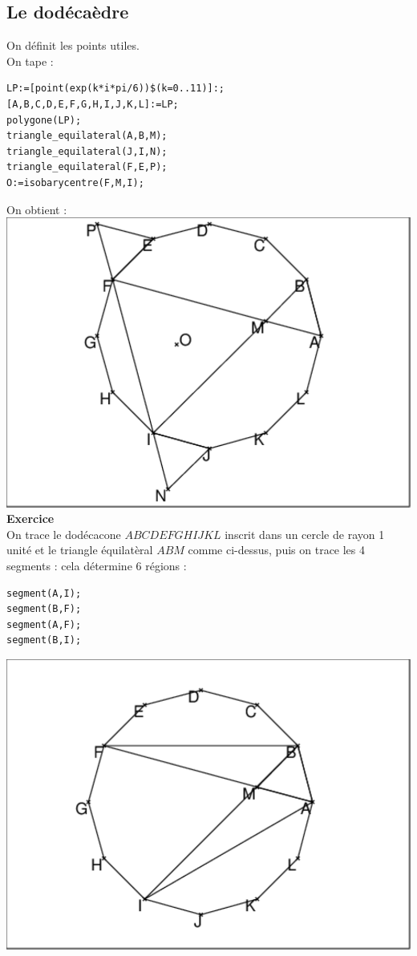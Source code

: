 \documentclass[a4paper,11pt]{book}
\begin{document}
\subsection{Le dod\'eca\`edre}
On d\'efinit les points utiles.\\
On tape :
\begin{verbatim}
LP:=[point(exp(k*i*pi/6))$(k=0..11)]:;
[A,B,C,D,E,F,G,H,I,J,K,L]:=LP;
polygone(LP);
triangle_equilateral(A,B,M);
triangle_equilateral(J,I,N);
triangle_equilateral(F,E,P);
O:=isobarycentre(F,M,I);
\end{verbatim}
On obtient :\\
\includegraphics[width=\textwidth]{carredode}
{\bf Exercice}\\
On trace le dod\'ecacone $ABCDEFGHIJKL$ inscrit dans un cercle de rayon 1 
unit\'e et le triangle \'equilat\`eral $ABM$ comme ci-dessus, puis on trace 
les 4 segments : cela d\'etermine 6 r\'egions :\\
\begin{verbatim}
segment(A,I);
segment(B,F);
segment(A,F);
segment(B,I);
\end{verbatim}
\includegraphics[width=\textwidth]{carredode0}\\
\end{document}
